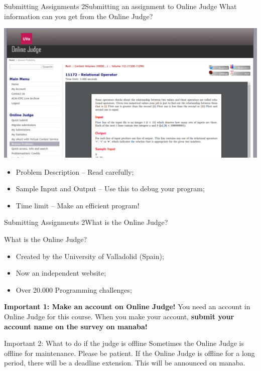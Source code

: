 \begin{frame}{Submitting Assignments 2}{Submitting an assignment to Online Judge}
  What information can you get from the Online Judge?
  \begin{center}
    \includegraphics[width=.4\textwidth]{img/relationaloperator}
  \end{center}
  \begin{itemize}
    \item Problem Description -- Read carefully;
    \item Sample Input and Output -- Use this to debug your program;
    \item Time limit -- Make an efficient program!
  \end{itemize}
\end{frame}


\begin{frame}{Submitting Assignments 2}{What is the Online Judge?}

  \begin{block}{What is the Online Judge?}
    \begin{itemize}
      \item Created by the University of Valladolid (Spain);
      \item Now an independent website;
      \item Over 20.000 Programming challenges;
    \end{itemize}
  \end{block}
  \begin{alertblock}{{\bf Important 1: Make an account on Online Judge!}}
    You need an account in Online Judge for this course. When you make your account, {\bf submit your account name on the survey on manaba!}
  \end{alertblock}
  \begin{alertblock}{Important 2: What to do if the judge is offline}
    Sometimes the Online Judge is offline for maintenance. Please be patient.
    If the Online Judge is offline for a long period, there will be a deadline
    extension. This will be announced on manaba.
  \end{alertblock}
\end{frame}

